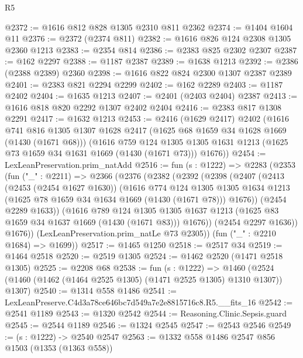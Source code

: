 \begin{lexlean}{R5}
\begin{coremodule}
@2372 := @1616 @812 @828 @1305 @2310 @811 @2362
@2374 := @1404 @1604 @11
@2376 := @2372 (@2374 @811)
@2382 := @1616 @826 @124 @2308 @1305 @2360 @1213
@2383 := @2354 @814
@2386 := @2383 @825 @2302 @2307
@2387 := @162 @2297
@2388 := @1187 @2387
@2389 := @1638 @1213
@2392 := @2386 (@2388 @2389) @2360
@2398 := @1616 @822 @824 @2300 @1307 @2387 @2389
@2401 := @2383 @821 @2294 @2299
@2402 := @162 @2289
@2403 := @1187 @2402
@2404 := @1635 @1213
@2407 := @2401 (@2403 @2404) @2387
@2413 := @1616 @818 @820 @2292 @1307 @2402 @2404
@2416 := @2383 @817 @1308 @2291
@2417 := @1632 @1213
@2453 := @2416
    (@1629 @2417)
    @2402
    (@1616
      @741
      @816
      @1305
      @1307
      @1628
      @2417
      (@1625 @68 @1659 @34 @1628 @1669 (@1430 (@1671 @68)))
      (@1616
        @759
        @124
        @1305
        @1305
        @1631
        @1213
        (@1625 @73 @1659 @34 @1631 @1669 (@1430 (@1671 @73)))
        @1676))
@2454 := LexLeanPreservation.prim_natAdd
@2516 := fun (s : @1222) =>
  @2283
    (@2353
      (fun ("_" : @2211) =>
      @2366
        (@2376
          (@2382
            (@2392
              (@2398
                (@2407
                  (@2413
                    (@2453 (@2454 @1627 @1630))
                    (@1616
                      @774
                      @124
                      @1305
                      @1305
                      @1634
                      @1213
                      (@1625 @78 @1659 @34 @1634 @1669 (@1430 (@1671 @78)))
                      @1676))
                  (@2454 @2289 @1633))
                (@1616
                  @789
                  @124
                  @1305
                  @1305
                  @1637
                  @1213
                  (@1625 @83 @1659 @34 @1637 @1669 (@1430 (@1671 @83)))
                  @1676))
              (@2454 @2297 @1636))
            @1676))
        (LexLeanPreservation.prim_natLe @73 @2305))
      (fun ("_" : @2210 @1684) => @1699))
@2517 := @1465 @1250
@2518 := @2517 @34
@2519 := @1464 @2518
@2520 := @2519 @1305
@2524 := @1462 @2520 (@1471 @2518 @1305)
@2525 := @2208 @68
@2538 := fun (s : @1222) =>
  @1460 (@2524 (@1460 (@1462 (@1464 @2525 @1305) (@1471 @2525 @1305) @1310 @1307)) @1307)
@2540 := @1314 @558 @1486
@2541 := LexLeanPreserve.C4d3a78ce646bc7d549a7e2e8815716c8.R5.__fits_16
@2542 := @2541 @1189
@2543 := @1320 @2542
@2544 := Reasoning.Clinic.Sepsis.guard
@2545 := @2544 @1189
@2546 := @1324 @2545
@2547 := @2543 @2546
@2549 := (s : @1222) -> @2540 @2547
@2563 := @1332
    @558
    @1486
    @2547
    @856
    @1503
    (@1353 (@1363 @558))

\end{coremodule}
\end{lexlean}
